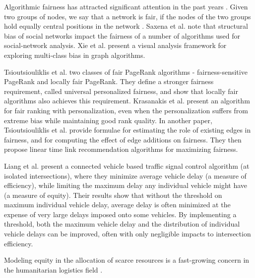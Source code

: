 Algorithmic fairness has attracted significant attention in the past years \cite{tsioutsiouliklis2021fairness}. Given two groups of nodes, we say that a network is fair, if the nodes of the two groups hold equally central positions in the network \cite{pitoura2023pagerank}. Saxena et al. \cite{saxena2022fairsna} note that structural bias of social networks impact the fairness of a number of algorithms used for social-network analysis. Xie et al. \cite{xie2021fairrankvis} present a visual analysis framework for exploring multi-class bias in graph algorithms.

Tsioutsiouliklis et al. \cite{tsioutsiouliklis2021fairness} two classes of fair PageRank algorithms - fairness-sensitive PageRank and locally fair PageRank. They define a stronger fairness requirement, called universal personalized fairness, and show that locally fair algorithms also achieves this requirement. Krasanakis et al. \cite{krasanakis2021applying} present an algorithm for fair ranking with personalization, even when the personalization suffers from extreme bias while maintaining good rank quality. In another paper, Tsioutsiouliklis et al. \cite{tsioutsiouliklis2022link} provide formulae for estimating the role of existing edges in fairness, and for computing the effect of edge additions on fairness. They then propose linear time link recommendation algorithms for maximizing fairness.


Liang et al. \cite{liang2020equitable} present a connected vehicle based traffic signal control algorithm (at isolated intersections), where they minimize average vehicle delay (a measure of efficiency), while limiting the maximum delay any individual vehicle might have (a measure of equity). Their results show that without the threshold on maximum individual vehicle delay, average delay is often minimized at the expense of very large delays imposed onto some vehicles. By implementing a threshold, both the maximum vehicle delay and the distribution of individual vehicle delays can be improved, often with only negligible impacts to intersection efficiency.

Modeling equity in the allocation of scarce resources is a fast-growing concern in the humanitarian logistics field \cite{alem2022revisiting}.

